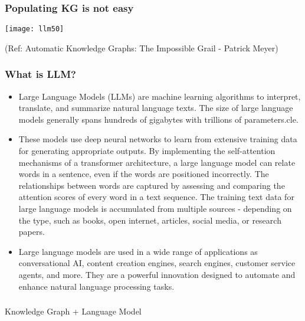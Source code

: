 \begin{frame}[fragile]\frametitle{Populating KG is not easy}

\begin{center}
\texttt{[image: llm50]}
\end{center}

{\tiny (Ref: Automatic Knowledge Graphs: The Impossible Grail - Patrick Meyer)}

\end{frame}

\begin{frame}[fragile]\frametitle{What is LLM?}

\begin{itemize}
\item Large Language Models (LLMs) are machine learning algorithms to interpret, translate, and summarize natural language texts. The size of large language models generally spans hundreds of gigabytes with trillions of parameters.cle.
\item These models use deep neural networks to learn from extensive training data for generating appropriate outputs. By implementing the self-attention mechanisms of a transformer architecture, a large language model can relate words in a sentence, even if the words are positioned incorrectly. The relationships between words are captured by assessing and comparing the attention scores of every word in a text sequence. The training text data for large language models is accumulated from multiple sources - depending on the type, such as books, open internet, articles, social media, or research papers. 
\item Large language models are used in a wide range of applications as conversational AI, content creation engines, search engines, customer service agents, and more. They are a powerful innovation designed to automate and enhance natural language processing tasks.
\end{itemize}

\end{frame}


\begin{frame}[fragile]\frametitle{}
\begin{center}
{\Large Knowledge Graph + Language Model}

\end{center}
\end{frame}


